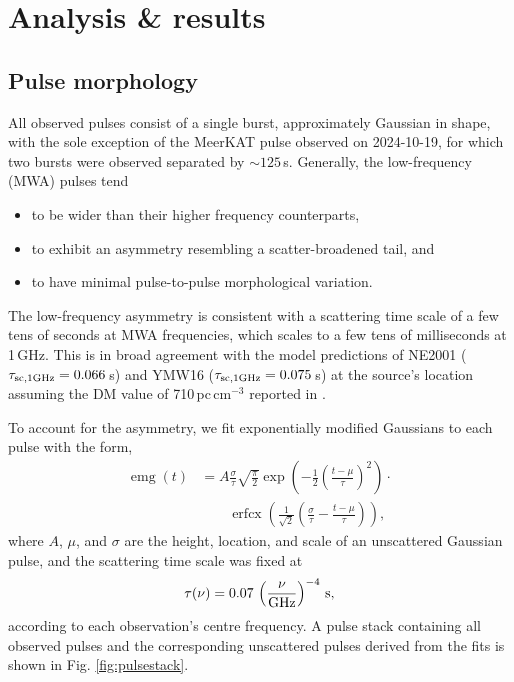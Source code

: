 \documentclass[fleqn,usenatbib]{mnras}
\DeclareMathOperator{\erfcx}{erfcx}
\DeclareMathOperator{\emg}{emg}
\begin{document}
\section{Analysis \& results} \label{sec:analysis}


\subsection{Pulse morphology}

All observed pulses consist of a single burst, approximately Gaussian in shape, with the sole exception of the MeerKAT pulse observed on 2024-10-19, for which two bursts were observed separated by ${\sim}125\,$s.
Generally, the low-frequency (MWA) pulses tend
\begin{itemize}
    \item to be wider than their higher frequency counterparts,
    \item to exhibit an asymmetry resembling a scatter-broadened tail, and
    \item to have minimal pulse-to-pulse morphological variation.
\end{itemize}

The low-frequency asymmetry is consistent with a scattering time scale of a few tens of seconds at MWA frequencies, which scales to a few tens of milliseconds at 1\,GHz.
This is in broad agreement with the model predictions of NE2001 ($\tau_{\rm sc,1GHz} = 0.066\,$s) and YMW16 ($\tau_{\rm sc,1 GHz} = 0.075\,$s) at the source's location assuming the DM value of 710\,pc\,cm$^{-3}$ reported in .

To account for the asymmetry, we fit exponentially modified Gaussians to each pulse with the form,
\begin{equation}
  \begin{aligned}
        \emg(t) &= A \frac{\sigma}{\tau}\sqrt{\frac{\pi}{2}}
                   \exp\left(-\frac12 \left( \frac{t - \mu}{\tau} \right)^2 \right) \cdot {} \\
                            &\qquad \erfcx \left(\frac{1}{\sqrt{2}} \left(\frac{\sigma}{\tau} 
                             - \frac{t - \mu}{\tau} \right) \right),
  \end{aligned}
  \label{eqn:emg}
\end{equation}
where $A$, $\mu$, and $\sigma$ are the height, location, and scale of an unscattered Gaussian pulse, and the scattering time scale was fixed at
\begin{equation}
      \tau(\nu) = 0.07\, \left(\frac{\nu}{\rm GHz}\right)^{-4} \, {\rm s},
\end{equation}
according to each observation's centre frequency.
A pulse stack containing all observed pulses and the corresponding unscattered pulses derived from the fits is shown in Fig. \ref{fig:pulsestack}.
\end{document}
